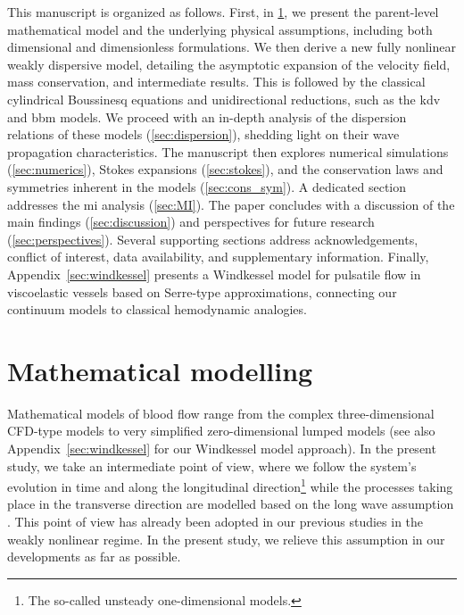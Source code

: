 \documentclass[alpha-refs, 12pt]{wiley-article}
\begin{document}
This manuscript is organized as follows. First, in \cref{sec:model}, we present the parent-level mathematical model and the underlying physical assumptions, including both dimensional and dimensionless formulations. We then derive a new fully nonlinear weakly dispersive model, detailing the asymptotic expansion of the velocity field, mass conservation, and intermediate results. This is followed by the classical cylindrical Boussinesq equations and unidirectional reductions, such as the \acrfull{kdv} and \acrfull{bbm} models. We proceed with an in-depth analysis of the dispersion relations of these models (\cref{sec:dispersion}), shedding light on their wave propagation characteristics. The manuscript then explores numerical simulations (\cref{sec:numerics}), Stokes expansions (\cref{sec:stokes}), and the conservation laws and symmetries inherent in the models (\cref{sec:cons_sym}). A dedicated section addresses the \acrshort{mi} analysis (\cref{sec:MI}). The paper concludes with a discussion of the main findings (\cref{sec:discussion}) and perspectives for future research (\cref{sec:perspectives}). Several supporting sections address acknowledgements, conflict of interest, data availability, and supplementary information. Finally, Appendix~\ref{sec:windkessel} presents a Windkessel model for pulsatile flow in viscoelastic vessels based on Serre-type approximations, connecting our continuum models to classical hemodynamic analogies.

\section{Mathematical modelling}
\label{sec:model}

Mathematical models of blood flow range from the complex three-dimensional CFD-type models \citep{Roe2005} to very simplified zero-dimensional lumped models \citep{Milisic2004, Alastruey2008} (see also Appendix~\ref{sec:windkessel} for our Windkessel model approach). In the present study, we take an intermediate point of view, where we follow the system's evolution in time and along the longitudinal direction\footnote{The so-called unsteady one-dimensional models.} \citep{Sherwin2003, Alastruey2011} while the processes taking place in the transverse direction are modelled based on the long wave assumption \citep{Lavrentiev1947, Serre1956, BCL, Khakimzyanov2019}. This point of view has already been adopted in our previous studies \citep{Mitsotakis2018, Mitsotakis2019} in the weakly nonlinear regime. In the present study, we relieve this assumption in our developments as far as possible.
\end{document}
